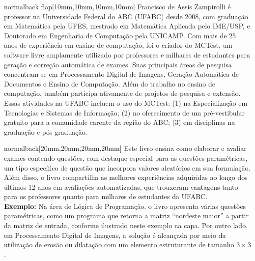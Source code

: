 \documentclass[
    coverwidth=21cm,  %
    coverheight=29.7cm, %
    spinewidth=12mm,  %
    ]{bookcover}
\begin{document}
\begin{bookcover}
\begin{bookcoverelement}{normal}{back flap}[10mm,10mm,10mm,10mm]
    \color{black}\large
    Francisco de Assis Zampirolli é professor na Universidade Federal do ABC (UFABC) desde 2008, com graduação em Matemática pela UFES, mestrado em Matemática Aplicada pelo IME/USP, e Doutorado em Engenharia de Computação pela UNICAMP. Com mais de 25 anos de experiência em ensino de computação, foi o criador do MCTest, um software livre amplamente utilizado por professores e mi\-lhares de estudantes para geração e correção automática de exames. Suas principais áreas de pesquisa concentram-se em Processamento Digital de Imagens, Geração Automática de Documentos e Ensino de Computação.
Além do trabalho no ensino de computação, também participa ativamente de projetos de pesquisa e extensão. Essas atividades na UFABC incluem o uso do MCTest:
(1) na Especialização em Tecnologias e Sistemas de Informação;
(2) no oferecimento de um pré-vestibular gratuito para a comunidade carente da região do ABC;
(3) em disciplinas na graduação e pós-graduação.
     \vfill
\end{bookcoverelement}


\begin{bookcoverelement}{normal}{back}[20mm,20mm,20mm,20mm]
\color{black}\Large
Este livro ensina como elaborar e avaliar exames contendo questões, com destaque especial para as questões paramétricas, um tipo específico de questão que incorpora valores aleatórios em sua formulação. Além disso, o livro compartilha as melhores experiências adquiridas ao longo dos últimos 12 anos em avaliações automatizadas, que trouxeram vantagens tanto para os professores quanto para milhares de estudantes da UFABC. \\[3mm]

\textbf{Exemplo:} Na área de Lógica de Programação, o livro apresenta várias questões paramétricas, como um programa que retorna a matriz ``nordeste maior'' a partir da matriz de entrada, conforme ilustrado neste exemplo na capa. Por outro lado, em Processamento Digital de Imagens, a solução é alcançada por meio da utilização de erosão ou dilatação com um elemento estruturante de tamanho $3\times 3$. \\[95mm]


\end{bookcoverelement}
\end{bookcover}
\end{document}
